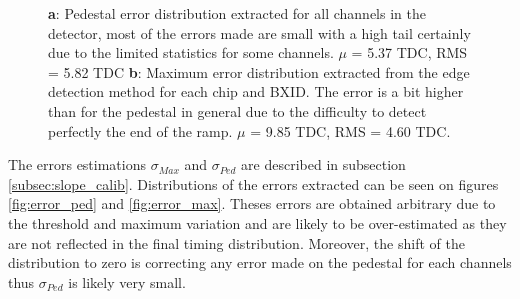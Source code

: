 \documentclass[twoside,a4paper,11pt]{article}
\begin{document}
\begin{appendix}
\begin{figure}[htbp]
	\hfill
	\caption[]{\textbf{a}: Pedestal error distribution extracted for all channels in the detector, most of the errors made are small with a high tail certainly due to the limited statistics for some channels. $\mu$ = 5.37 TDC, RMS = 5.82 TDC \textbf{b}: Maximum error distribution extracted from the edge detection method for each chip and BXID. The error is a bit higher than for the pedestal in general due to the difficulty to detect perfectly the end of the ramp. $\mu$ = 9.85 TDC, RMS = 4.60 TDC.}
	\label{fig:error_dist}
\end{figure}
The errors estimations $\sigma_{Max}$ and $\sigma_{Ped}$ are described in subsection \ref{subsec:slope_calib}. Distributions of the errors extracted can be seen on figures \ref{fig:error_ped} and \ref{fig:error_max}. Theses errors are obtained arbitrary due to the threshold and maximum variation and are likely to be over-estimated as they are not reflected in the final timing distribution. Moreover, the shift of the distribution to zero is correcting any error made on the pedestal for each channels thus $\sigma_{Ped}$ is likely very small. 
\begin{figure}[htbp]
	\hfill

\end{figure}
\end{appendix}
\end{document}

